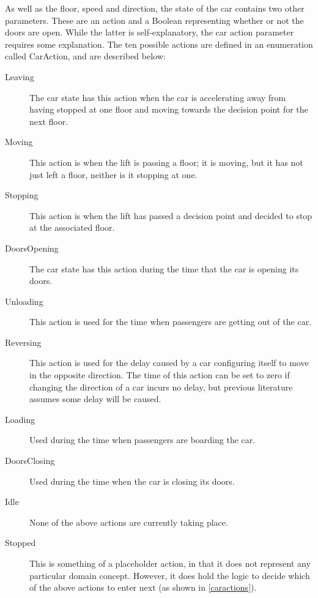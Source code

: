 \documentclass{UoYCSproject}
\begin{document}
As well as the floor, speed and direction, the state of the car contains two other parameters.  These are an action and a Boolean representing whether or not the doors are open.  While the latter is self-explanatory, the car action parameter requires some explanation.  The ten possible actions are defined in an enumeration called CarAction, and are described below:
\begin{description}
	\item[Leaving] The car state has this action when the car is accelerating away from having stopped at one floor and moving towards the decision point for the next floor.
	\item[Moving] This action is when the lift is passing a floor; it is moving, but it has not just left a floor, neither is it stopping at one.
	\item[Stopping] This action is when the lift has passed a decision point and decided to stop at the associated floor.
	\item[DoorsOpening] The car state has this action during the time that the car is opening its doors.
	\item[Unloading] This action is used for the time when passengers are getting out of the car.
	\item[Reversing] This action is used for the delay caused by a car configuring itself to move in the opposite direction.  The time of this action can be set to zero if changing the direction of a car incurs no delay, but previous literature assumes some delay will be caused.
	\item[Loading] Used during the time when passengers are boarding the car.
	\item[DoorsClosing] Used during the time when the car is closing its doors.
	\item[Idle] None of the above actions are currently taking place.
	\item[Stopped] This is something of a placeholder action, in that it does not represent any particular domain concept.  However, it does hold the logic to decide which of the above actions to enter next (as shown in \autoref{caractions}).
\end{description}
\end{document}
